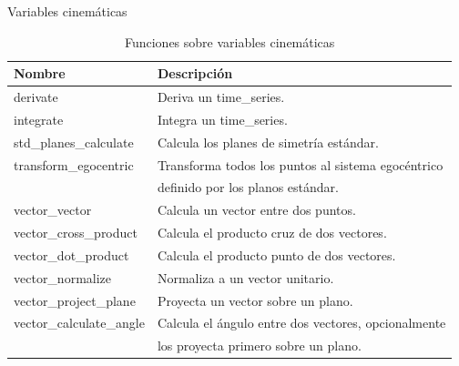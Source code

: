 \documentclass{beamer} %
\newcommand{\mono}[1]{{\ttfamily #1}}
\begin{document}
\begin{frame}{Variables cinemáticas}
\begin{table}
    \centering
    \caption{Funciones sobre variables cinemáticas}
    \label{tab:kinematics}
    \scriptsize
    \begin{tabular}{ll}
        \toprule
        Nombre & Descripción \\
        \midrule
        \mono{derivate} & Deriva un \mono{time\_series}. \\
        \mono{integrate} & Integra un \mono{time\_series}. \\
        \mono{std\_planes\_calculate} & Calcula los planes de simetría estándar. \\
        \mono{transform\_egocentric} & Transforma todos los puntos al sistema egocéntrico \\ & definido por los planos estándar. \\
        \mono{vector\_vector} & Calcula un vector entre dos puntos. \\
        \mono{vector\_cross\_product} & Calcula el producto cruz de dos vectores. \\
        \mono{vector\_dot\_product} & Calcula el producto punto de dos vectores. \\
        \mono{vector\_normalize} & Normaliza a un vector unitario. \\
        \mono{vector\_project\_plane} & Proyecta un vector sobre un plano. \\
        \mono{vector\_calculate\_angle} & Calcula el ángulo entre dos vectores, opcionalmente \\ & los proyecta primero sobre un plano. \\
        \bottomrule
    \end{tabular}
\end{table}
\end{frame}
\end{document}
